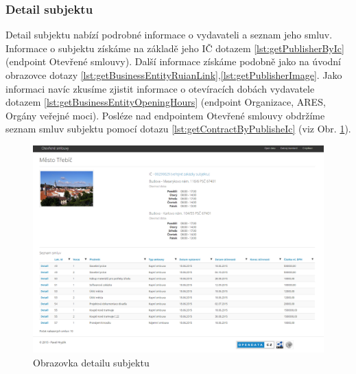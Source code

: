 









\subsubsection*{Detail subjektu}

Detail subjektu nabízí podrobné informace o vydavateli a seznam jeho smluv. Informace o subjektu získáme na základě jeho IČ dotazem \ref{lst:getPublisherByIc} (endpoint Otevřené smlouvy). Další informace získáme podobně jako na úvodní obrazovce dotazy \ref{lst:getBusinessEntityRuianLink},\ref{lst:getPublisherImage}. Jako informaci navíc zkusíme zjistit informace o otevíracích dobách vydavatele dotazem \ref{lst:getBusinessEntityOpeningHours} (endpoint Organizace, ARES, Orgány veřejné moci). Posléze nad endpointem Otevřené smlouvy obdržíme seznam smluv subjektu pomocí dotazu \ref{lst:getContractByPublisheIc} (viz Obr. \ref{obr:webSubjectDetail}).\\

\begin{figure}[H]
\centerline{\includegraphics[width=\textwidth]{img/webSubjectDetail.eps}}
\caption{Obrazovka detailu subjektu}
\label{obr:webSubjectDetail}
\end{figure}

